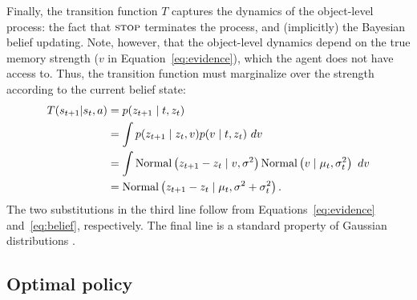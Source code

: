 Finally, the transition function $T$ captures the dynamics of the object-level process: the fact that $\textsc{stop}$ terminates the process, and (implicitly) the Bayesian belief updating. Note, however, that the object-level dynamics depend on the true memory strength ($v$ in Equation~\ref{eq:evidence}), which the agent does not have access to. Thus, the transition function must marginalize over the strength according to the current belief state:
%
\begin{equation}\label{eq:mem-transition}
\begin{aligned}
  T(s_{t+1} | s_t, a) 
  &= p(z_{t+1} \mid t, z_t) \\
  &= \int p(z_{t+1} \mid z_t, v) p(v \mid t, z_t) \ dv \\
  &= \int \mathrm{Normal}\left( z_{t+1} - z_t \mid v, \sigma^2 \right) 
          \mathrm{Normal}\left( v \mid \mu_t, \sigma_t^2 \right)\ dv \\
  &= \mathrm{Normal}\left( z_{t+1} - z_t \mid \mu_t, \sigma^2 + \sigma_t^2 \right).
\end{aligned}
\end{equation}
%
The two substitutions in the third line follow from Equations~\ref{eq:evidence} and~\ref{eq:belief}, respectively. The final line is a standard property of Gaussian distributions \citep{murphy2007conjugate}.


\subsection{Optimal policy}

